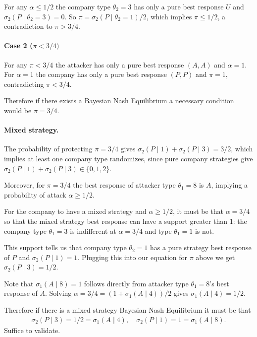 \documentclass[11pt]{exam}
\begin{document}
\begin{questions}
\begin{parts}
    For any $\alpha \leq 1/2$ the company type $\theta_2=3$ has only a pure best response $U$ and $\sigma_2(P\mid\theta_2=3)=0$. So $\pi = \sigma_2(P\mid\theta_2=1)/2$, which implies $\pi \leq 1/2$, a contradiction to $\pi > 3/4$.    
    
    \paragraph{Case 2 ($\pi < 3/4)$}
    For any $\pi < 3/4$ the attacker has only a pure best response $(A,A)$ and $\alpha = 1$. For $\alpha = 1$ the company has only a pure best response $(P,P)$ and $\pi = 1$, contradicting $\pi < 3/4$. 

    Therefore if there exists a Bayesian Nash Equilibrium a necessary condition would be $\pi = 3/4$.

    \paragraph{Mixed strategy.}
    The probability of protecting $\pi = 3/4$ gives $\sigma_2(P\mid 1) + \sigma_2(P\mid 3) = 3/2$,
    which implies at least one company type randomizes, since pure company strategies give $\sigma_2(P\mid 1) + \sigma_2(P\mid 3) \in \{0, 1, 2\}$.

    Moreover, for $\pi = 3/4$ the best response of attacker type $\theta_1=8$ is $A$, implying a probability of attack $\alpha \geq 1/2$. 

    For the company to have a mixed strategy and $\alpha \geq 1/2$, it must be that $\alpha = 3/4$ so that the mixed strategy best response can have a support greater than 1: the company type $\theta_1=3$ is indifferent at $\alpha=3/4$ and type $\theta_1=1$ is not.

    This support tells us that company type $\theta_2=1$ has a pure strategy best response of $P$ and $\sigma_2(P\mid 1) = 1$. Plugging this into our equation for $\pi$ above we get $\sigma_2(P\mid 3) = 1/2$.

    Note that $\sigma_1(A\mid8) = 1$ follows directly from attacker type $\theta_1=8$'s best response of $A$. Solving $\alpha = 3/4 = (1 + \sigma_1(A\mid4))/2$ gives $\sigma_1(A\mid4)= 1/2$.  

    Therefore if there is a mixed strategy Bayesian Nash Equilibrium it must be that
    \begin{align*}
        \sigma_2(P\mid 3) = 1/2 = \sigma_1(A\mid4),\quad \sigma_2(P\mid1) = 1 = \sigma_1(A\mid8).
    \end{align*}
    Suffice to validate.


\end{parts}
\end{questions}
\end{document}
